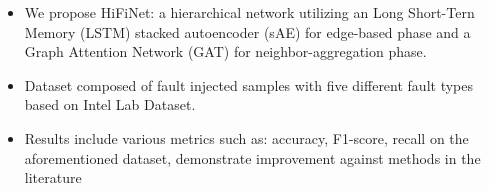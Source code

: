 \begin{itemize} 
  \item We propose HiFiNet: a hierarchical network utilizing an Long Short-Tern Memory (LSTM) stacked autoencoder (sAE) for edge-based phase and a Graph Attention Network (GAT) for neighbor-aggregation phase. 
  \item Dataset composed of fault injected samples with five different fault types based on Intel Lab Dataset. 
  \item Results include various metrics such as: accuracy, F1-score, recall on the aforementioned dataset, demonstrate improvement against methods in the literature \end{itemize}
